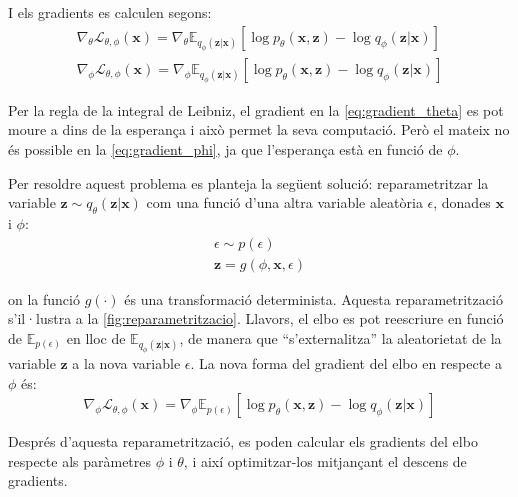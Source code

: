 \documentclass[CAT,BIB]{TFUOC}%
\begin{document}
        I els gradients es calculen segons:
        \begin{gather}
        \label{eq:gradient_theta}
            \nabla_\theta \mathcal{L}_{\theta,\phi}(\mathbf{x}) =
            \nabla_\theta \mathbb{E}_{q_\phi(\mathbf{z|x})} [
            \log p_\theta(\mathbf{x,z}) -
            \log q_\phi(\mathbf{z|x})
            ]
        \\
        \label{eq:gradient_phi}
            \nabla_\phi \mathcal{L}_{\theta,\phi}(\mathbf{x}) =
            \nabla_\phi \mathbb{E}_{q_\phi(\mathbf{z|x})} [
            \log p_\theta(\mathbf{x,z}) -
            \log q_\phi(\mathbf{z|x})
            ]
        \end{gather}

        Per la regla de la integral de Leibniz, el gradient en la \cref{eq:gradient_theta} es pot moure a dins de la esperança i això permet la seva computació. Però el mateix no és possible en la \cref{eq:gradient_phi}, ja que l'esperança està en funció de $\phi$.

        Per resoldre aquest problema es planteja la següent solució:
        reparametritzar la variable $\mathbf{z} \sim q_\theta(\mathbf{z|x})$
        com una funció d'una altra variable aleatòria $\epsilon$, donades $\mathbf{x}$ i $\phi$:
        \begin{gather}
        \label{eq:epsilon}
            \epsilon \sim p(\epsilon) \\
        \label{eq:z_reparam}
            \mathbf{z} = g(\phi, \mathbf{x}, \epsilon)
        \end{gather}

        on la funció $g(\cdot)$ és una transformació determinista.
        Aquesta reparametrització s'il·lustra a la \cref{fig:reparametritzacio}.
        Llavors, el \gls{elbo} es pot reescriure
        en funció de $\mathbb{E}_{p(\epsilon)}$
        en lloc de $\mathbb{E}_{q_\phi(\mathbf{z|x})}$,
        de manera que ``s'externalitza'' la aleatorietat de la variable $\mathbf{z}$
        a la nova variable $\epsilon$.
        La nova forma del gradient del \gls{elbo} en respecte a $\phi$ és:
        \begin{equation}
        \label{eq:gradient_phi_reparam}
            \nabla_\phi \mathcal{L}_{\theta,\phi}(\mathbf{x}) =
            \nabla_\phi \mathbb{E}_{p(\epsilon)} [
                \log p_\theta(\mathbf{x,z}) -
                \log q_\phi(\mathbf{z|x})
            ]
        \end{equation}

        Després d'aquesta reparametrització,
        es poden calcular els gradients del \gls{elbo}
        respecte als paràmetres $\phi$ i $\theta$,
        i així optimitzar-los mitjançant el descens de gradients.
\end{document}
